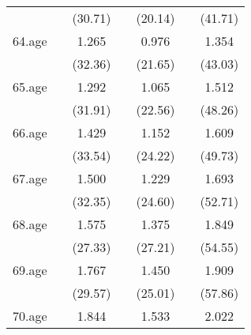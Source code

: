 {\begin{tabular}{l*{6}{c}}
            &                     &     (30.71)         &                     &     (20.14)         &                     &     (41.71)         \\
[1em]
64.age      &                     &       1.265\sym{***}&                     &       0.976\sym{***}&                     &       1.354\sym{***}\\
            &                     &     (32.36)         &                     &     (21.65)         &                     &     (43.03)         \\
[1em]
65.age      &                     &       1.292\sym{***}&                     &       1.065\sym{***}&                     &       1.512\sym{***}\\
            &                     &     (31.91)         &                     &     (22.56)         &                     &     (48.26)         \\
[1em]
66.age      &                     &       1.429\sym{***}&                     &       1.152\sym{***}&                     &       1.609\sym{***}\\
            &                     &     (33.54)         &                     &     (24.22)         &                     &     (49.73)         \\
[1em]
67.age      &                     &       1.500\sym{***}&                     &       1.229\sym{***}&                     &       1.693\sym{***}\\
            &                     &     (32.35)         &                     &     (24.60)         &                     &     (52.71)         \\
[1em]
68.age      &                     &       1.575\sym{***}&                     &       1.375\sym{***}&                     &       1.849\sym{***}\\
            &                     &     (27.33)         &                     &     (27.21)         &                     &     (54.55)         \\
[1em]
69.age      &                     &       1.767\sym{***}&                     &       1.450\sym{***}&                     &       1.909\sym{***}\\
            &                     &     (29.57)         &                     &     (25.01)         &                     &     (57.86)         \\
[1em]
70.age      &                     &       1.844\sym{***}&                     &       1.533\sym{***}&                     &       2.022\sym{***}\\

\end{tabular}}

